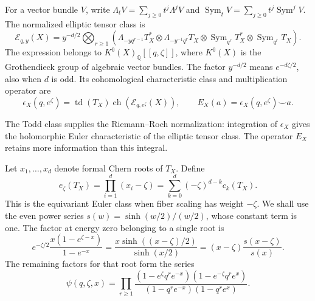 For a vector bundle $V$, write
$\Lambda_tV=\sum_{j\geq0}t^j\Lambda^jV$ and
$\operatorname{Sym}_tV=\sum_{j\geq0}t^j\operatorname{Sym}^jV$.
The normalized elliptic tensor class is
\begin{equation}\label{ed:eq:elliptic-tensor}
 \mathcal E_{q,y}(X)=y^{-d/2}
 \bigotimes_{r\geq1}
 \left(
 \Lambda_{-yq^{r-1}}T_X^*\otimes
 \Lambda_{-y^{-1}q^r}T_X\otimes
 \operatorname{Sym}_{q^r}T_X^*\otimes
 \operatorname{Sym}_{q^r}T_X
 \right).
\end{equation}
The expression belongs to $K^0(X)_{\mathbb Q}[[q,\zeta]]$, where
$K^0(X)$ is the Grothendieck group of algebraic vector bundles.
The factor $y^{-d/2}$ means $e^{-d\zeta/2}$, also when $d$ is odd.
Its cohomological characteristic class and multiplication operator are
\begin{equation}\label{ed:eq:epsilon}
 \epsilon_X(q,e^\zeta)
 =\operatorname{td}(T_X)\operatorname{ch}(\mathcal E_{q,e^\zeta}(X)),
 \qquad E_X(a)=\epsilon_X(q,e^\zeta)\smile a.
\end{equation}

The Todd class supplies the Riemann--Roch normalization: integration of
$\epsilon_X$ gives the holomorphic Euler characteristic of the elliptic
tensor class. The operator $E_X$ retains more information than this
integral.

Let $x_1,\ldots,x_d$ denote formal Chern roots of $T_X$. Define
\begin{equation}\label{ed:eq:euler}
 e_\zeta(T_X)=\prod_{i=1}^d(x_i-\zeta)
 =\sum_{k=0}^d(-\zeta)^{d-k}c_k(T_X).
\end{equation}
This is the equivariant Euler class when fiber scaling has weight
$-\zeta$. We shall use the even power series
$s(w)=\sinh(w/2)/(w/2)$, whose constant term is one.
The factor at energy zero belonging to a single root is
\begin{equation}\label{ed:eq:single-root}
 e^{-\zeta/2}\frac{x(1-e^{\zeta-x})}{1-e^{-x}}
 =\frac{x\sinh((x-\zeta)/2)}{\sinh(x/2)}
 =(x-\zeta)\frac{s(x-\zeta)}{s(x)}.
\end{equation}
The remaining factors for that root form the series
\[
 \psi(q,\zeta,x)=
 \prod_{r\geq1}
 \frac{(1-e^\zeta q^r e^{-x})(1-e^{-\zeta}q^r e^x)}
      {(1-q^r e^{-x})(1-q^r e^x)}.
\]


